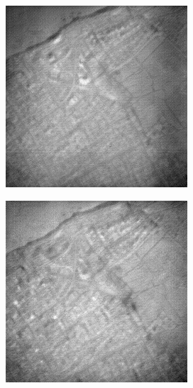 \documentclass[10pt,twocolumn,letterpaper]{article}
\begin{document}
\begin{figure}[!ht]
\begin{subfigure}[b]{0.19\textwidth}
  \end{subfigure}
  \hfill
  \begin{subfigure}[b]{0.19\textwidth}
      \centering
      \includegraphics[width=\textwidth]{../figs/outputs/cut/3.png}
  \end{subfigure}
  \hfill
  \begin{subfigure}[b]{0.19\textwidth}
      \centering
      \includegraphics[width=\textwidth]{../figs/outputs/petit/3.png}

\end{subfigure}
\end{figure}
\end{document}
